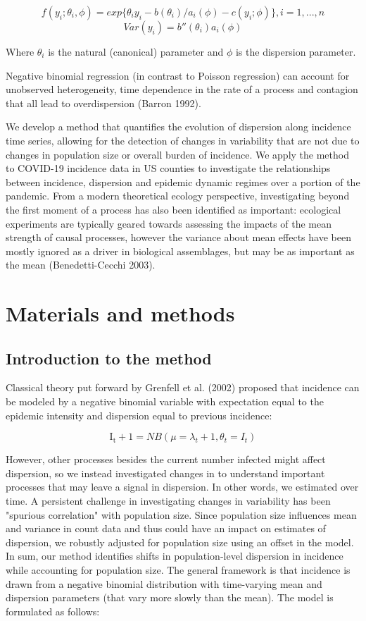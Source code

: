 \documentclass[10pt,letterpaper]{article}
\begin{document}
$$f(y_i; \theta_i, \phi) = exp\{\theta_i y_i - b(\theta_i)/a_i(\phi) - c(y_i; \phi)\}, i = 1,...,n$$
$$Var(y_i) = b''(\theta_i) a_i(\phi) $$

Where $\theta_i$ is the natural (canonical) parameter and $\phi$ is the dispersion parameter.

Negative binomial regression (in contrast to Poisson regression) can account for unobserved heterogeneity, time dependence in the rate of a process and contagion that all lead to overdispersion (Barron 1992).

We develop a method that quantifies the evolution of dispersion along incidence time series, allowing for the detection of changes in variability that are not due to changes in population size or overall burden of incidence. We apply the method to COVID-19 incidence data in US counties to investigate the relationships between incidence, dispersion and epidemic dynamic regimes over a portion of the pandemic. From a modern theoretical ecology perspective, investigating beyond the first moment of a process has also been identified as important: ecological experiments are typically geared towards assessing the impacts of the mean strength of causal processes, however the variance about mean effects have been mostly ignored as a driver in biological assemblages, but may be as important as the mean (Benedetti-Cecchi 2003).

\section*{Materials and methods}
\subsection*{Introduction to the method}

Classical theory put forward by Grenfell et al. (2002) proposed that incidence can be modeled by a negative binomial variable with expectation equal to the epidemic intensity and dispersion equal to previous incidence:

    $$\mathrm{I_t+1} = NB(\mu = \lambda_t+1, \theta_t = I_t)$$

However, other processes besides the current number infected might affect dispersion, so we instead investigated changes in 
 to understand important processes that may leave a signal in dispersion. In other words, we estimated 
 over time. A persistent challenge in investigating changes in variability has been "spurious correlation" with population size. Since population size influences mean and variance in count data and thus could have an impact on estimates of dispersion, we robustly adjusted for population size using an offset in the model. In sum, our method identifies shifts in population-level dispersion in incidence while accounting for population size. The general framework is that incidence is drawn from a negative binomial distribution with time-varying mean and dispersion parameters (that vary more slowly than the mean). The model is formulated as follows:
\end{document}
